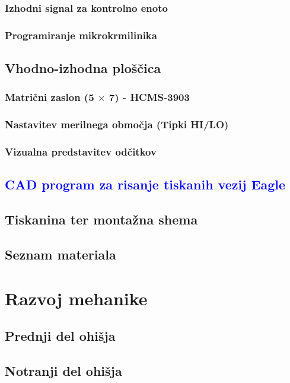 \documentclass[11pt,fleqn]{book}
\begin{document}
\subsection{Izhodni signal za kontrolno enoto}
\subsection{Programiranje mikrokrmilinika}
\section{Vhodno-izhodna ploščica} %
\subsection{Matrični zaslon (5 $\times$ 7) - HCMS-3903} %
\subsection{Nastavitev merilnega območja (Tipki HI/LO)}
\subsection{Vizualna predstavitev odčitkov} %
\section{\textcolor{blue}{CAD program za risanje tiskanih vezij Eagle}}
\section{Tiskanina ter montažna shema}
\section{Seznam materiala}

\chapter{Razvoj mehanike} 
\blindtext [5]
\section{Prednji del ohišja}
\blindtext [5]
\section{Notranji del ohišja}
\blindtext [5]
\blindtext [5]
\end{document}
